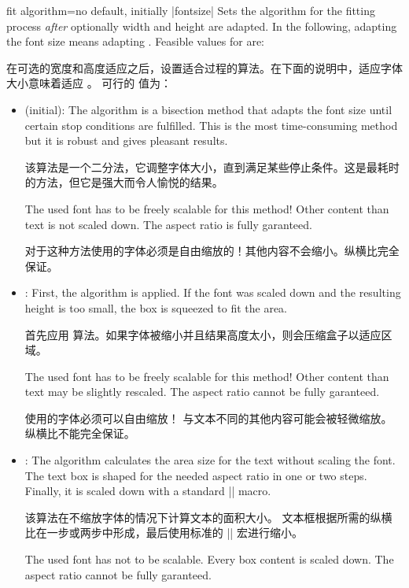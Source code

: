 \begin{docTcbKey}{fit algorithm}{=}{no default, initially |fontsize|}
Sets the algorithm for the fitting process \emph{after} optionally width and height
are adapted. In the following, adapting the font size means adapting
.
  Feasible values for  are:

在可选的宽度和高度适应之后，设置适合过程的算法。在下面的说明中，适应字体大小意味着适应 。
可行的  值为：
  \begin{itemize}
  \item{} (initial):
    The algorithm is a bisection method that adapts the font size until
    certain stop conditions are fulfilled. This is the most time-consuming
    method but it is robust and gives pleasant results.

    该算法是一个二分法，它调整字体大小，直到满足某些停止条件。这是最耗时的方法，但它是强大而令人愉悦的结果。
    \begin{marker}
    The used font has to be freely scalable for this method!
    Other content than text is not scaled down.
    The aspect ratio is fully garanteed.

    对于这种方法使用的字体必须是自由缩放的！其他内容不会缩小。纵横比完全保证。
    \end{marker}
  \item{}:
    First, the  algorithm is applied. If the font was scaled down
    and the resulting height is too small, the box is squeezed to fit the area.

    首先应用  算法。如果字体被缩小并且结果高度太小，则会压缩盒子以适应区域。
    \begin{marker}
    The used font has to be freely scalable for this method!
    Other content than text may be slightly rescaled.
    The aspect ratio cannot be fully garanteed.

使用的字体必须可以自由缩放！
与文本不同的其他内容可能会被轻微缩放。
纵横比不能完全保证。
    \end{marker}
  \item{}:
    The algorithm calculates the area size for the text without scaling the font.
    The text box is shaped for the needed aspect ratio in one or two
    steps. Finally, it is scaled down with a standard |\resizebox| macro.

该算法在不缩放字体的情况下计算文本的面积大小。
文本框根据所需的纵横比在一步或两步中形成，最后使用标准的 |\resizebox| 宏进行缩小。
    \begin{marker}
    The used font has not to be scalable. Every box content is scaled down.
    The aspect ratio cannot be fully garanteed.


\end{marker}
\end{itemize}
\end{docTcbKey}
